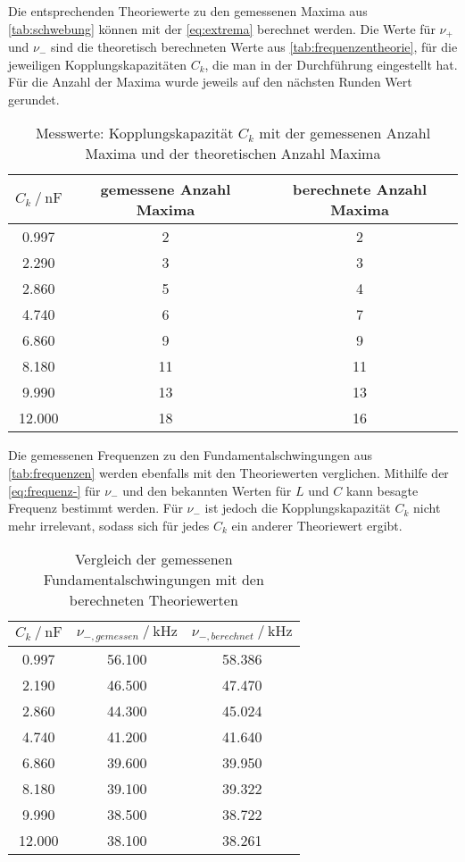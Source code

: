 Die entsprechenden Theoriewerte zu den gemessenen Maxima aus \autoref{tab:schwebung} können mit der \autoref{eq:extrema} berechnet werden. Die Werte für $\nu _+$ und $\nu _-$ sind die theoretisch berechneten Werte aus \autoref{tab:frequenzentheorie}, für die jeweiligen Kopplungskapazitäten $C_k$, die man in der Durchführung eingestellt hat. Für die Anzahl der Maxima wurde jeweils auf den nächsten Runden Wert gerundet.

\begin{table}
  \centering
  \caption{Messwerte: Kopplungskapazität $C_k $ mit der gemessenen Anzahl Maxima und der theoretischen Anzahl Maxima }
  \label{tab:schwebungstheorie}
  \begin{tabular}{c c c}
    \toprule 
    $C_k \:/\: \si{\nano\farad}$ & gemessene Anzahl Maxima &  berechnete Anzahl Maxima   \\ 
    \midrule 
    0.997 & 2 & 2 \\
    2.290 & 3 & 3 \\
    2.860 & 5 & 4 \\
    4.740 & 6 & 7 \\
    6.860 & 9 & 9 \\
    8.180 & 11 & 11 \\
    9.990 & 13 & 13 \\
    12.000 & 18 & 16 \\
    \bottomrule
  \end{tabular}
\end{table}

Die gemessenen Frequenzen zu den Fundamentalschwingungen aus \autoref{tab:frequenzen} werden ebenfalls mit den Theoriewerten verglichen. Mithilfe der \autoref{eq:frequenz-} für $\nu _-$ und den bekannten Werten für $L$ und $C$ kann besagte Frequenz bestimmt werden. Für $\nu_-$ ist jedoch die Kopplungskapazität $C_k$ nicht mehr irrelevant, sodass sich für jedes $C_k$ ein anderer Theoriewert ergibt.

\begin{table}
  \centering
  \caption{Vergleich der gemessenen Fundamentalschwingungen mit den berechneten Theoriewerten}
  \label{tab:frequenzentheorie}
  \begin{tabular}{c c c}
    \toprule 
    $C_k \:/\: \si{\nano\farad}$ & $\nu _{-,gemessen} \:/\: \si{\kilo\hertz}$ & $\nu _{-,berechnet} \:/\: \si{\kilo\hertz}$    \\ 
    \midrule 
    0.997 & 56.100 & 58.386 \\
    2.190 & 46.500 & 47.470 \\
    2.860 & 44.300 & 45.024 \\
    4.740 & 41.200 & 41.640 \\
    6.860 & 39.600 & 39.950 \\
    8.180 & 39.100 & 39.322 \\
    9.990 & 38.500 & 38.722 \\
    12.000 & 38.100 & 38.261 \\
    \bottomrule
  \end{tabular}
\end{table}

